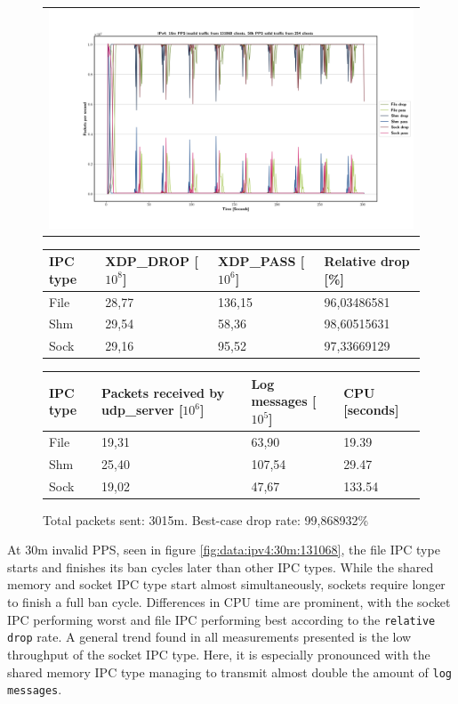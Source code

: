 \begin{figure}[!h]
	\centering
	\scriptsize
	\begin{tabular}{c}
    	\centerline{\includegraphics[width=1.2\textwidth]{images/IPv4_10m_131068_1.png}}
	\end{tabular}
	\begin{tabular}{llll}
		\toprule
		\textbf{IPC type} & \textbf{XDP\_DROP [$10^8$]} & \textbf{XDP\_PASS [$10^6$]} & \textbf{Relative drop [\%]} \\ \midrule 
		File & 28,77 & 136,15 & 96,03486581 \\
        Shm & 29,54 & 58,36 & 98,60515631 \\
        Sock & 29,16 & 95,52 & 97,33669129 \\
	\bottomrule
	\end{tabular}
    \begin{tabular}{llll}
		\toprule
		\textbf{IPC type} & \textbf{Packets received by udp\_server [$10^6$]} & \textbf{Log messages [$10^5$]} & \textbf{CPU [seconds]} \\ \midrule 
		File & 19,31 & 63,90 & 19.39 \\
        Shm & 25,40 & 107,54 & 29.47 \\
        Sock & 19,02 & 47,67 & 133.54 \\
	\bottomrule
	\end{tabular}
	\caption[Simplefail2ban, IPv4, 10m \ac{PPS}, 131068 malicious clients]{Total packets sent: 3015m. Best-case drop rate: 99,868932\%}
	\label{fig:data:ipv4:10m:131068}
\end{figure}

At 30m invalid \ac{PPS}, seen in figure \ref{fig:data:ipv4:30m:131068}, the file \ac{IPC} type starts and finishes its ban cycles later than other \ac{IPC} types.
While the shared memory and socket \ac{IPC} type start almost simultaneously, sockets require longer to finish a full ban cycle.
Differences in \ac{CPU} time are prominent, with the socket \ac{IPC} performing worst and file \ac{IPC} performing best according to the \texttt{relative drop} rate.
A general trend found in all measurements presented is the low throughput of the socket \ac{IPC} type.
Here, it is especially pronounced with the shared memory \ac{IPC} type managing to transmit almost double the amount of \texttt{log messages}.

